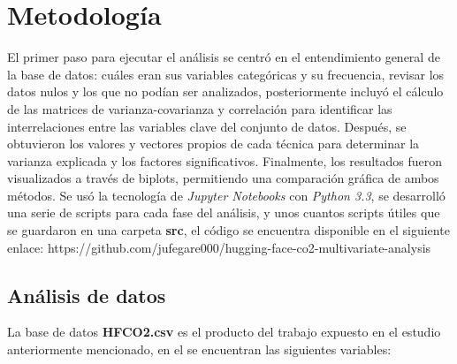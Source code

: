 \documentclass[journal]{IEEEtran}
\begin{document}
	\section{Metodología}
	\label{sec:methodology}
	El primer paso para ejecutar el análisis se centró en el entendimiento general de la base de datos: cuáles eran sus variables categóricas y su frecuencia, revisar los datos nulos y los que no podían ser analizados, posteriormente incluyó el cálculo de las matrices de varianza-covarianza y correlación para identificar las interrelaciones entre las variables clave del conjunto de datos. Después, se obtuvieron los valores y vectores propios de cada técnica para determinar la varianza explicada y los factores significativos. Finalmente, los resultados fueron visualizados a través de biplots, permitiendo una comparación gráfica de ambos métodos. Se usó la tecnología de \textit{Jupyter Notebooks} con \textit{Python 3.3}, se desarrolló una serie de scripts para cada fase del análisis, y unos cuantos scripts útiles que se guardaron en una carpeta \textbf{src}, el código se encuentra disponible en el siguiente enlace:
	https://github.com/jufegare000/hugging-face-co2-multivariate-analysis

	\subsection{Análisis de datos}
	\label{ssec:pca}
	La base de datos \textbf{HFCO2.csv} es el producto del trabajo expuesto en el estudio anteriormente mencionado, en el se encuentran las siguientes variables:
\end{document}
